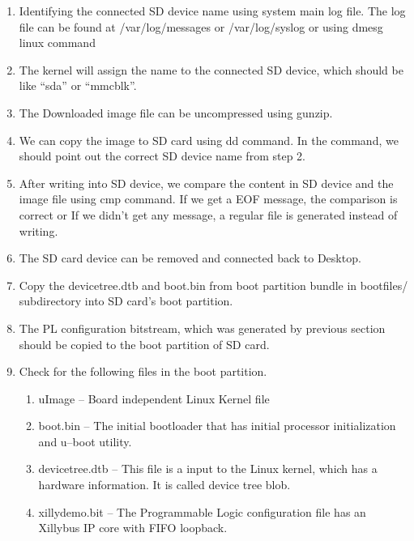 \begin{enumerate}\itemsep0em 
	\item Identifying the connected SD device name using system main log file. The log file can be found at /var/log/messages or /var/log/syslog or using dmesg linux command
	
	\item The kernel will assign the name to the connected SD device, which should be like “sda” or “mmcblk”.
	\item The Downloaded image file can be uncompressed using gunzip.
	
	\item We can copy the image to SD card using dd command. In the command, we should point out the correct SD device name from step 2.
	
	\item After writing into SD device, we compare the content in SD device and the image file using cmp command. If we get a EOF message, the comparison is correct or If we didn’t get any message, a regular file is generated instead of writing.
	
	\item The SD card device can be removed and connected back to Desktop.
	\item Copy the devicetree.dtb and boot.bin from boot partition bundle in bootfiles/ subdirectory into SD card’s boot partition. 
	\item The PL configuration bitstream, which was generated by previous section should be copied to the boot partition of SD card.
	\item Check for the following files in the boot partition.
	\begin{enumerate}\itemsep0em 
		\item uImage -- Board independent Linux Kernel file
		\item boot.bin -- The initial bootloader that has initial processor initialization and u--boot utility.
		\item devicetree.dtb -- This file is a input to the Linux kernel, which has a hardware information. It is called device tree blob.
		\item xillydemo.bit -- The Programmable Logic configuration file has an Xillybus IP core with FIFO loopback.
	\end{enumerate}
\end{enumerate}

